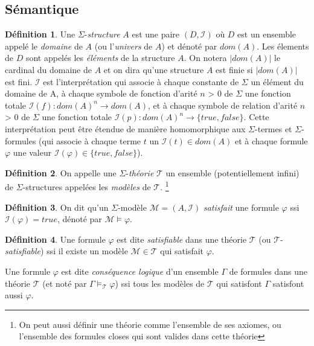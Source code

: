 \documentclass[a4paper, twoside]{scrartcl}
\theoremstyle{plain}%
\theoremstyle{definition}
\newtheorem{defn}{Définition}[section]
\theoremstyle{remark}
\begin{document}
\subsection{Sémantique}

\begin{defn}
  Une $\Sigma$-\emph{structure} $A$ est une paire $(D, \mathcal{I})$
  où $D$ est un ensemble appelé le \emph{domaine} de $A$ (ou
  l'\emph{univers} de $A$) et dénoté par $dom(A)$. Les élements de $D$
  sont appelés les \emph{éléments} de la structure $A$. On notera
  $|dom(A)|$ le cardinal du domaine de $A$ et on dira qu'une structure
  $A$ est finie si $|dom(A)|$ est fini. $\mathcal{I}$ est
  l'interprétation qui associe à chaque constante de $\Sigma$ un
  élément du domaine de A, à chaque symbole de fonction d'arité $n$ >
  0 de $\Sigma$ une fonction totale $\mathcal{I}(f) : dom(A)^n \to
  dom(A)$, et à chaque symbole de relation d'arité $n$ > 0 de $\Sigma$
  une fonction totale $\mathcal{I}(p) : dom(A)^n \to \{true,false\}$.
  Cette interprétation peut être étendue de manière homomorphique aux
  $\Sigma$-termes et $\Sigma$-formules (qui associe à chaque terme $t$
  un $\mathcal{I}(t) \in dom(A)$ et à chaque formule $\varphi$ une
  valeur $\mathcal{I}(\varphi) \in \{true,false\}$).
\end{defn}

\begin{defn}
  On appelle une $\Sigma$-\emph{théorie} $\mathcal{T}$ un
  ensemble (potentiellement infini) de $\Sigma$-structures appelées
  les \emph{modèles} de $\mathcal{T}$.
  \footnote{On peut aussi définir une théorie comme l'ensemble de ses
    axiomes, ou l'ensemble des formules closes qui sont valides dans
    cette théorie}
\end{defn}
 

\begin{defn}
  On dit qu'un $\Sigma$-modèle $\mathcal{M} = (A, \mathcal{I})$
  \emph{satisfait} une formule $\varphi$ ssi $\mathcal{I}(\varphi) =
  true$, dénoté par $\mathcal{M} \vDash \varphi$.
\end{defn}

\begin{defn}
  Une formule $\varphi$ est dite \emph{satisfiable} dans une théorie
  $\mathcal{T}$ (ou $\mathcal{T}$-\emph{satisfiable}) ssi il existe un
  modèle $\mathcal{M} \in \mathcal{T}$ qui satisfait $\varphi$.

  Une formule $\varphi$ est dite \emph{conséquence logique} d'un
  ensemble $\Gamma$ de formules dans une théorie $\mathcal{T}$ (et
  noté par $\Gamma \vDash_{\mathcal{T}} \varphi$) ssi tous les modèles
  de $\mathcal{T}$ qui satisfont $\Gamma$ satisfont aussi $\varphi$.
  
\end{defn}
\end{document}
